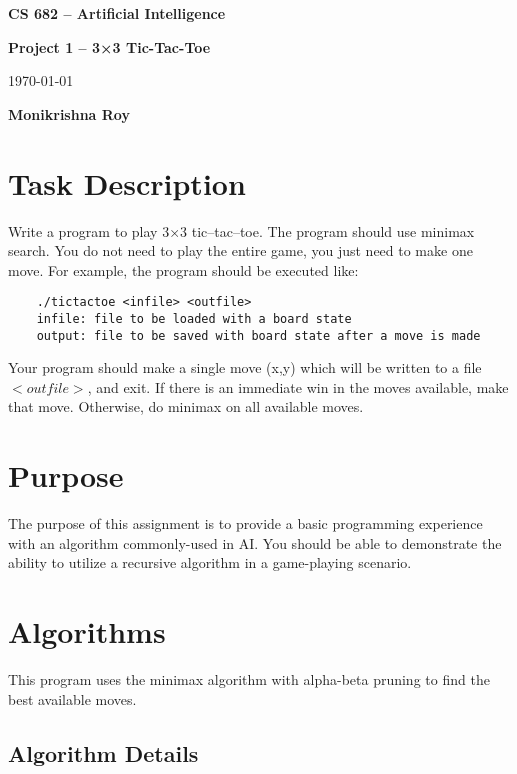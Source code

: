 \documentclass[twoside,10pt]{article}
\begin{document}
\begin{center}
    {\Large \bf CS 682 – Artificial Intelligence}


    {\Large \bf Project 1 – 3×3 Tic-Tac-Toe}


    {\large \today}

    {\large \bf Monikrishna Roy}

\end{center}

\section*{Task Description}
Write a program to play 3×3 tic–tac–toe. The program should use minimax search. You do not need to play the entire game, you just need to make one move. For example, the program should be executed like:

\begin{verbatim}    
    ./tictactoe <infile> <outfile>
    infile: file to be loaded with a board state
    output: file to be saved with board state after a move is made
\end{verbatim}

Your program should make a single move (x,y) which will be written to a file $<outfile>$, and exit. If there is an immediate win in the moves available, make that move. Otherwise, do minimax on all available moves.

\section*{Purpose}

The purpose of this assignment is to provide a basic programming experience with an algorithm commonly-used in AI. You should be able to demonstrate the ability to utilize a recursive algorithm in a game-playing scenario.

\section*{Algorithms}

This program uses the minimax algorithm with alpha-beta pruning to find the best available moves.

\subsection*{Algorithm Details}
\end{document}
